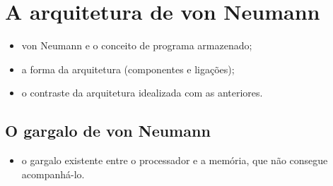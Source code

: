 \section{A arquitetura de von Neumann}
   
    \begin{itemize}
        \item von Neumann e o conceito de programa armazenado;
        \item a forma da arquitetura (componentes e ligações);
        \item o contraste da arquitetura idealizada com as anteriores.
    \end{itemize}
    
    \subsection{O gargalo de von Neumann}
    
        \begin{itemize}
            \item o gargalo existente entre o processador e a memória, 
            que não consegue acompanhá-lo.
        \end{itemize} 